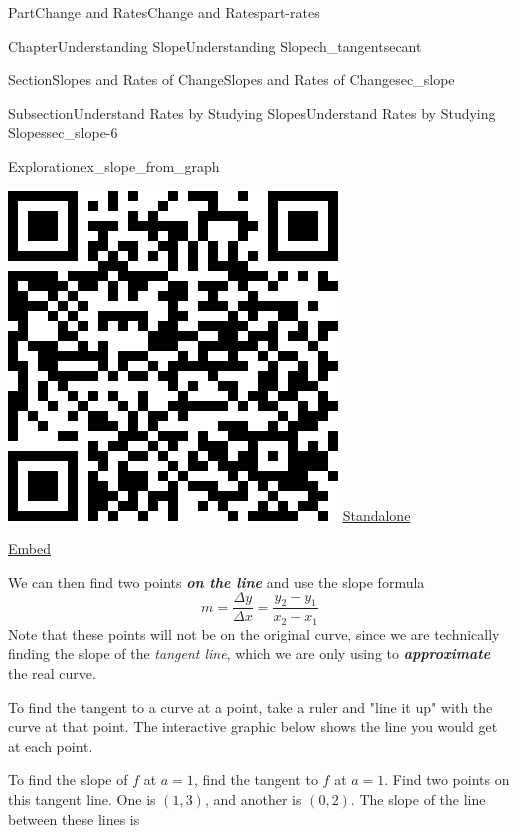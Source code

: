 \documentclass{tufte-book}
\newcommand{\alert}[1]{\textbf{\textit{#1}}}
\numberwithin{equation}{chapter}
\begin{document}
\begin{partptx}{Part}{Change and Rates}{}{Change and Rates}{}{}{part-rates}
\begin{chapterptx}{Chapter}{Understanding Slope}{}{Understanding Slope}{}{}{ch_tangentsecant}
\begin{sectionptx}{Section}{Slopes and Rates of Change}{}{Slopes and Rates of Change}{}{}{sec_slope}
\begin{subsectionptx}{Subsection}{Understand Rates by Studying Slopes}{}{Understand Rates by Studying Slopes}{}{}{sec_slope-6}
\begin{exploration}{Exploration}{}{ex_slope_from_graph}
\begin{enumerate}[font=\bfseries,label=(\alph*),ref=\alph*]
\begin{sidebyside}{2}{0.075}{0.075}{0.17}
\begin{sbspanel}{0.21}
\includegraphics[width=\linewidth]{generated/qrcode/ex_slope_from_graph-2-2-2.png}
\href{http://webwork.bridgew.edu/oer/functions_at_work/ex_slope_from_graph-2-2-2.html}{Standalone}%
\par
\href{http://webwork.bridgew.edu/oer/functions_at_work/ex_slope_from_graph-2-2-2-if.html}{Embed}%
\end{sbspanel}%
\end{sidebyside}%
\par
We can then find two points \alert{on the line} and use the slope formula%
\begin{equation*}
m = \dfrac{\Delta y}{\Delta x} = \dfrac{y_2-y_1}{x_2-x_1}
\end{equation*}
Note that these points will not be on the original curve, since we are technically finding the slope of the \emph{tangent line}, which we are only using to \alert{approximate} the real curve.%
\par
To find the tangent to a curve at a point, take a ruler and "line it up" with the curve at that point. The interactive graphic below shows the line you would get at each point.%
\par
To find the slope of \(f\) at \(a=1\), find the tangent to \(f\) at \(a=1\). Find two points on this tangent line.  One is \((1,3)\), and another is \((0,2)\). The slope of the line between these lines is%

\end{enumerate}
\end{exploration}
\end{subsectionptx}
\end{sectionptx}
\end{chapterptx}
\end{partptx}
\end{document}
